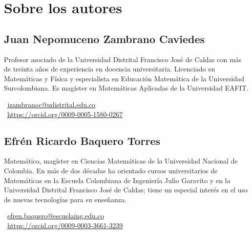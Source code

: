 \chapter*{Sobre los autores}

\section*{Juan Nepomuceno Zambrano Caviedes}

Profesor asociado de la Universidad Distrital Francisco José de Caldas con más de treinta años de experiencia en docencia universitaria. Licenciado en Matemáticas y Física y especialista en Educación Matemática de la Universidad Surcolombiana. Es magíster en Matemáticas Aplicadas de la Universidad EAFIT.

\faEnvelope~\url{jzambranoc@udistrital.edu.co}\\
\aiOrcid~\url{https://orcid.org/0009-0005-1580-0267}

\section*{Efrén Ricardo Baquero Torres}

Matemático, magíster en Ciencias Matemáticas de la Universidad Nacional de Colombia. En más de dos décadas ha orientado cursos universitarios de Matemáticas en la Escuela Colombiana de Ingeniería Julio Garavito y en la Universidad Distrital Francisco José de Caldas; tiene un especial
interés en el uso de nuevas tecnologías para su enseñanza.

\faEnvelope~\url{efren.baquero@escuelaing.edu.co}\\
\aiOrcid~\url{https://orcid.org/0009-0003-3661-3239}
